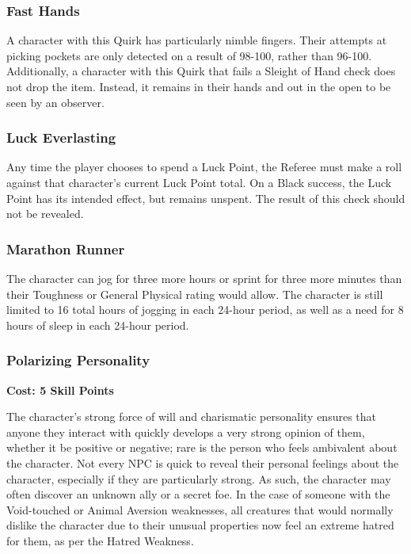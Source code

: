 \documentclass[oneside]{book}
\newcommand{\comment}[1]{}
\begin{document}
\begin{multicols}{2}
\subsubsection{Fast Hands}
A character with this Quirk has particularly nimble fingers. Their attempts at picking pockets are only detected on a result of 98-100, rather than 96-100. Additionally, a character with this Quirk that fails a Sleight of Hand check does not drop the item. Instead, it remains in their hands and out in the open to  be seen by an observer.

\subsubsection{Luck Everlasting}
Any time the player chooses to spend a Luck Point, the Referee must make a roll against that character's current Luck Point total. On a Black success, the Luck Point has its intended effect, but remains unspent. The result of this check should not be revealed. 

\subsubsection{Marathon Runner}
The character can jog for three more hours or sprint for three more minutes than their Toughness or General Physical rating would allow. The character is still limited to 16 total hours of jogging in each 24-hour period, as well as a need for 8 hours of sleep in each 24-hour period.

\comment{
\subsubsection{Military Background}
Characters with this Quirk must have a rating of at least 1 in the Weapon Skill for the standard-issue weapon of their homeland's military. 

Past time spent in the military has taught the character a variety of useful things. Not least of which being how to belittle subordinates. The character gets a +3 bonus to using Fast Talk or Persuade while interacting with non-hostile, rank-and-file members of a militia or military. 
}

\subsubsection{Polarizing Personality}
\textbf{\small Cost: 5 Skill Points}

The character's strong force of will and charismatic personality ensures that anyone they interact with quickly develops a very strong opinion of them, whether it be positive or negative; rare is the person who feels ambivalent about the character. Not every NPC is quick to reveal their personal feelings about the character, especially if they are particularly strong. As such, the character may often discover an unknown ally or a secret foe. In the case of someone with the Void-touched or Animal Aversion weaknesses, all creatures that would normally dislike the character due to their unusual properties now feel an extreme hatred for them, as per the Hatred Weakness.


\end{multicols}
\end{document}
